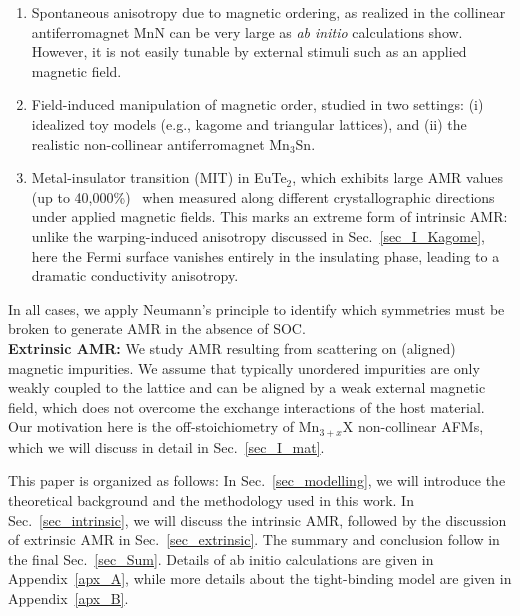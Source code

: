 \documentclass[prb,showpacs,amsmath,amssymb,superscriptaddress,twocolumn,floatfix]{revtex4-1}
\begin{document}
\begin{enumerate}
	\item Spontaneous anisotropy due to magnetic ordering, as realized in the collinear antiferromagnet MnN can be very large as \textit{ab initio} calculations show. However, it is not easily tunable by external stimuli such as an applied magnetic field.
	
	\item Field-induced manipulation of magnetic order, studied in two settings: (i) idealized toy models (e.g., kagome and triangular lattices), and (ii) the realistic non-collinear antiferromagnet Mn$_3$Sn. %
	\item Metal-insulator transition (MIT) in EuTe$_2$, which exhibits large AMR values (up to 40,000\%)~\cite{Yang:2021} when measured along different crystallographic directions under applied magnetic fields. This marks an extreme form of intrinsic AMR: unlike the warping-induced anisotropy discussed in Sec.~\ref{sec_I_Kagome}, here the Fermi surface vanishes entirely in the insulating phase, leading to a dramatic conductivity anisotropy.
\end{enumerate}
	
In all cases, we apply Neumann’s principle to identify which symmetries must be broken to generate AMR in the absence of SOC. \\

\textbf{Extrinsic AMR:} We study AMR resulting from scattering on (aligned) magnetic impurities. We assume that typically unordered impurities are only weakly coupled to the lattice and can be aligned by a weak external magnetic field, which does not overcome the exchange interactions of the host material.
Our motivation here is the off-stoichiometry of Mn$_{3+x}$X non-collinear AFMs, which we will discuss in detail in Sec.~\ref{sec_I_mat}.

 

This paper is organized as follows: In Sec.~\ref{sec_modelling}, we
will introduce the theoretical background and the methodology used in this work. In Sec.~\ref{sec_intrinsic}, we will discuss the intrinsic AMR, followed by the discussion of extrinsic AMR in Sec.~\ref{sec_extrinsic}. The summary and conclusion follow in the final Sec.~\ref{sec_Sum}. Details of ab initio calculations are given in Appendix~\ref{apx_A}, while more details about the tight-binding model are given in Appendix~\ref{apx_B}.
\end{document}
